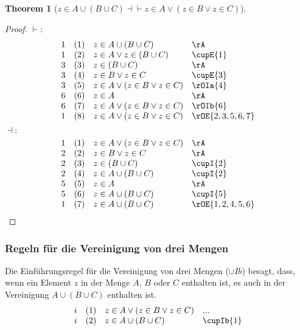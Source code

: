 \documentclass{book}
\theoremstyle{plain}
\newtheorem{theorem}{Theorem}
\theoremstyle{remark}
\theoremstyle{definition}
\begin{document}
\label{zInAcuLpBcuCRpEqvzInAOrLpzInBOrzInCRp}
\begin{theorem}[\(z \in A \cup (B\cup C) \dashv\vdash z \in A \lor (z \in B\lor z\in C)\)]
\end{theorem}	
\begin{proof}
	\(\vdash:\)
	\[
	\begin{array}{llll}
		1 & (1) & z\in A \cup (B\cup C) & \rA \\
		1 & (2) & z\in A\lor z\in (B\cup C) & \cupE{1} \\
		3 & (3) & z\in (B \cup C) & \rA \\
		3 & (4) & z\in B\lor z\in C & \cupE{3} \\
		3 & (5) & z\in A\lor (z\in B\lor z\in C) & \rOIa{4} \\
		6 & (6) & z\in A & \rA \\
		6 & (7) & z\in A\lor (z\in B\lor z\in C) & \rOIb{6}\\
		1 & (8) & z\in A\lor (z\in B\lor z\in C) & \rOE{2,3,5,6,7}\\		
	\end{array}
	\]
	\(\dashv:\)
	\[
	\begin{array}{llll}
		1 & (1) & z\in A\lor (z\in B\lor z\in C) & \rA\\			
		2 & (2) & z\in B\lor z\in C & \rA\\			
		2 & (3) & z\in (B\cup C) & \cupI{2}\\			
		2 & (4) & z\in A\cup (B\cup C) & \cupI{2}\\			
		5 & (5) & z\in A & \rA\\		
		5 & (6) & z\in A\cup (B\cup C) & \cupI{5}\\		
		1 & (7) & z\in A\cup (B\cup C) & \rOE{1,2,4,5,6}\\				
	\end{array}
	\]
\end{proof}

\subsubsection{Regeln für die Vereinigung von drei Mengen}
\label{rule:cupIb} \label{rule:cupEb}

Die Einführungsregel für die Vereinigung von drei Mengen (\( \cup Ib \)) besagt, dass, wenn ein Element \( z \) in der Menge \( A \), \( B \) oder \( C \) enthalten ist, es auch in der Vereinigung \( A \cup (B \cup C) \) enthalten ist.
\[
\begin{array}{llll}
	i & (1) & z \in A\lor (z\in B\lor z\in C) & ... \\
	i & (2) & z \in A \cup (B \cup C) & \cupIb{1} \\
\end{array}
\]
\end{document}
